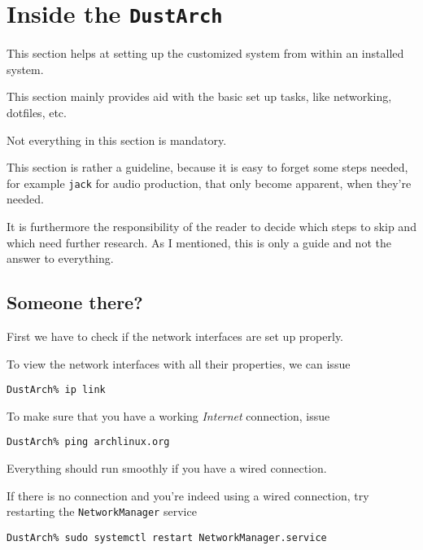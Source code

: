 \documentclass[10pt]{dustdoc}
\begin{document}
\chapter{Inside the \texttt{DustArch}}
\label{sec:inside-the-dustarch}

This section helps at setting up the customized system from within an installed system.

This section mainly provides aid with the basic set up tasks, like networking, dotfiles, etc.

\begin{NOTE}
    Not everything in this section is mandatory.

    This section is rather a guideline, because it is easy to forget some steps needed, for example \texttt{jack} for audio production, that only become apparent, when they’re needed.

    It is furthermore the responsibility of the reader to decide which steps to skip and which need further research.
    As I mentioned, this is only a guide and not the answer to everything.
\end{NOTE}

\section{Someone there?}
\label{sec:someone-there}

First we have to check if the network interfaces are set up properly.

To view the network interfaces with all their properties, we can issue

\begin{verbatim}
DustArch% ip link
\end{verbatim}

To make sure that you have a working \emph{Internet} connection, issue

\begin{verbatim}
DustArch% ping archlinux.org
\end{verbatim}

Everything should run smoothly if you have a wired connection.

If there is no connection and you’re indeed using a wired connection, try restarting the \texttt{NetworkManager} service

\begin{verbatim}
DustArch% sudo systemctl restart NetworkManager.service
\end{verbatim}
\end{document}
